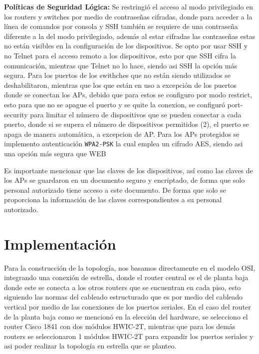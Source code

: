 \documentclass[letterpaper,11pt]{article}
\begin{document}
    \textbf{Políticas de Seguridad Lógica:} Se restringió el acceso al modo privilegiado en los routers y switches por medio de contraseñas cifradas, donde para acceder a la línea de comandos por consola y SSH también se requiere de una contraseña diferente a la del modo privilegiado, además al estar cifradas las contraseñas estas no están visibles en la configuración de los dispositivos. Se opto por usar SSH y no Telnet para el acceso remoto a los dispositivos, esto por que SSH cifra la comunicación, mientras que Telnet no lo hace, siendo asi SSH la opción más segura. Para los puertos de los swithches que no están siendo utilizados se  deshabilitaron, mientras que los que están en uso a excepción de los puertos donde se conectan los APs, debido que para estos se configuro por modo restrict, esto para que no se apague el puerto y se quite la conexion, se configuró port-security para limitar el número de dispositivos que se pueden conectar a cada puerto, donde si se supera el número de dispositivos permitidos (2), el puerto se apaga de manera automática, a excepcion de AP. Para los APs protegidos se implemento autenticación \texttt{WPA2-PSK} la cual emplea un cifrado AES, siendo asi una opción más segura que WEB

    Es importante mencionar que las claves de los dispositivos, así como las claves de los APs se guardaron en un documento seguro y encriptado, de forma que solo personal autorizado tiene acceso a este documento. De forma que solo se proporciona la información de las claves correspondientes a su personal autorizado.

    \section{Implementación}

    Para la construcción de la topología, nos basamos directamente en el modelo OSI, integrando una conexión de estrella, donde el router central es el de planta baja
    donde este se conecta a los otros routers que se encuentran en cada piso, esto siguiendo las normas del cableado estructurado que es por medio del cableado vertical
    por medio de las conexiones de los puertos seriales. En el caso del router de la planta baja como se mencionó en la elección del hardware, se selecciono el router Cisco 1841 con dos módulos HWIC-2T, mientras que para los demás routers se seleccionaron  1 módulos HWIC-2T para expandir los puertos seriales y asi poder realizar la topología en estrella que se planteo.
\end{document}
